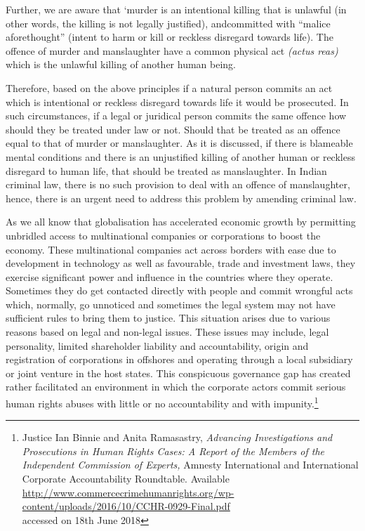 \begin{multicols}{2}
\noi
Further, we are aware that ‘murder is an intentional killing that is unlawful (in other
words, the killing is not legally justified), andcommitted with “malice aforethought”
(intent to harm or kill or reckless disregard towards life). The offence of murder and
manslaughter have a common physical act \textit{(actus reas)} which is the unlawful killing of
another human being.

\noi
Therefore, based on the above principles if a natural person commits an act which is
intentional or reckless disregard towards life it would be prosecuted. In such
circumstances, if a legal or juridical person commits the same offence how should
they be treated under law or not. Should that be treated as an offence equal to that of
murder or manslaughter. As it is discussed, if there is blameable mental conditions
and there is an unjustified killing of another human or reckless disregard to human
life, that should be treated as manslaughter. In Indian criminal law, there is no such
provision to deal with an offence of manslaughter, hence, there is an urgent need to
address this problem by amending criminal law.

\noi
As we all know that globalisation has accelerated economic growth by permitting
unbridled access to multinational companies or corporations to boost the economy.
These multinational companies act across borders with ease due to development in technology as well as favourable, trade and investment laws, they exercise significant
power and influence in the countries where they operate. Sometimes they do get
contacted directly with people and commit wrongful acts which, normally, go
unnoticed and sometimes the legal system may not have sufficient rules to bring them
to justice. This situation arises due to various reasons based on legal and non-legal
issues. These issues may include, legal personality, limited shareholder liability and
accountability, origin and registration of corporations in offshores and operating
through a local subsidiary or joint venture in the host states. This conspicuous
governance gap has created rather facilitated an environment in which the corporate
actors commit serious human rights abuses with little or no accountability and with
impunity.\footnote{Justice Ian Binnie and Anita Ramasastry, \textit{Advancing Investigations and Prosecutions in Human Rights
Cases: A Report of the Members of the Independent Commission of Experts,} Amnesty International and International Corporate Accountability Roundtable. Available \url{http://www.commercecrimehumanrights.org/wp-content/uploads/2016/10/CCHR-0929-Final.pdf}\\ accessed on 18th June 2018}


\end{multicols}
